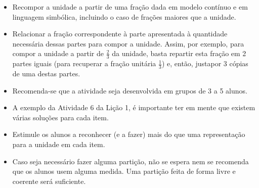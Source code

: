 \newpage
\begin{multicols}{2}

\begin{objetivos}{}{}
  \begin{itemize} %
    \item       Recompor a unidade a partir de uma fração dada em modelo contínuo e em linguagem simbólica, incluindo o caso de frações maiores que a unidade.
    \item       Relacionar a fração correspondente à parte apresentada à quantidade necessária dessas partes para compor a unidade. Assim, por exemplo, para compor a unidade a partir de       $\frac{2}{3}$ da unidade, basta repartir esta fração em 2 partes iguais (para recuperar a fração unitária       $\frac{1}{3}$) e, então, justapor 3 cópias de uma destas partes.
\end{itemize} %
\end{objetivos}

\begin{orientacoes}
  \begin{itemize} %
    \item       Recomenda-se que a atividade seja desenvolvida em grupos de 3 a 5 alunos.
    \item       A exemplo da Atividade 6 da Lição 1, é importante ter em mente que existem várias soluções para cada item.
    \item       Estimule os alunos a reconhecer (e a fazer) mais do que uma representação para a unidade em cada item.
    \item       Caso seja necessário fazer alguma partição, não se espera nem se recomenda que os alunos usem alguma medida. Uma partição feita de forma livre e coerente será suficiente.
\end{itemize} %
\end{orientacoes}
%



\end{multicols}

